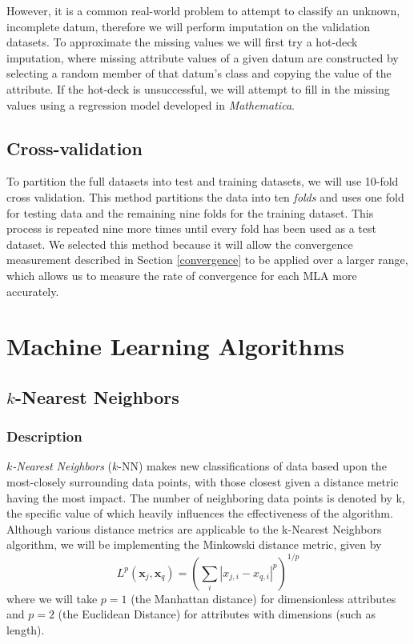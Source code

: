 \documentclass{article}
\newcommand{\ve}[1]{\boldsymbol{\mathbf{#1}}}
\begin{document}
			However, it is a common real-world problem to attempt to classify an unknown, incomplete datum, therefore we will perform imputation on the validation datasets. 
			To approximate the missing values we will first try a hot-deck imputation, where missing attribute values of a given datum are constructed by selecting a random member of that datum's class and copying the value of the attribute. 
			If the hot-deck is unsuccessful, we will attempt to fill in the missing values using a regression model developed in \textit{Mathematica}.
		\subsection{Cross-validation}
			\label{cv}
			To partition the full datasets into test and training datasets, we will use 10-fold cross validation. 
			This method partitions the data into ten \textit{folds} and uses one fold for testing data and the remaining nine folds for the training dataset. 
			This process is repeated nine more times until every fold has been used as a test dataset. 
			We selected this method because it will allow the convergence measurement described in Section \ref{convergence} to be applied over a larger range, which allows us to measure the rate of convergence for each MLA more accurately.
	\section{Machine Learning Algorithms}
		\label{mla}
		\subsection{$k$-Nearest Neighbors}
			\subsubsection{Description}
				\textit{$k$-Nearest Neighbors} ($k$-NN) makes new classifications of data based upon the most-closely surrounding data points, with those closest given a distance metric having the most impact.  
				The number of neighboring data points is denoted by k, the specific value of which heavily influences the effectiveness of the algorithm.  
				Although various distance metrics are applicable to the k-Nearest Neighbors algorithm, we will be implementing the Minkowski distance metric, given by
				\begin{equation*}
					L^p(\ve{x}_j,\ve{x}_q) = \left( \sum_i \left| x_{j,i} - x_{q,i} \right|^p \right)^{1/p}
				\end{equation*}
				where we will take $p=1$ (the Manhattan distance) for dimensionless attributes and $p=2$ (the Euclidean Distance) for attributes with dimensions (such as length).
				
\end{document}
